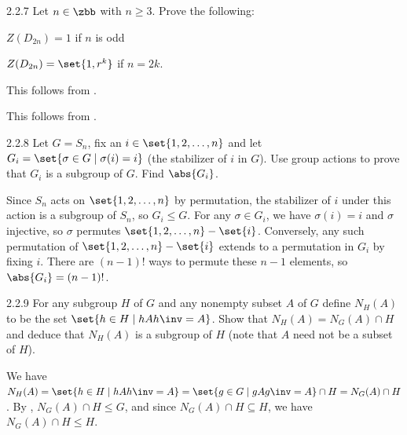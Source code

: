 \begin{exercise}{2.2.7} 
    Let $n \in \zbb$ with $n \geq 3$.
    Prove the following:
    \begin{subexercises}
        \item $Z(D_{2n}) = 1$ if $n$ is odd
        \item $Z(D_{2n}) = \set{1, r^k}$ if $n = 2k$.
    \end{subexercises}
\end{exercise}

\begin{solenum}
    \item This follows from .
    \item This follows from .
\end{solenum}

\begin{exercise}{2.2.8}
    Let $G = S_n$, fix an $i \in \set{1, 2, \dots, n}$ and let $G_i=\set{\sigma\in G\mid\sigma(i)=i}$ (the stabilizer of $i$ in $G$).
	Use group actions to prove that $G_i$ is a subgroup of $G$.
	Find $\abs{G_i}$.
\end{exercise}

\begin{sol}
    Since $S_n$ acts on $\set{1, 2, \ldots, n}$ by permutation, the stabilizer of $i$ under this action is a subgroup of $S_n$, so $G_i \leq G$.
    For any $\sigma \in G_i$, we have $\sigma(i) = i$ and $\sigma$ injective, so $\sigma$ permutes $\set{1, 2, \ldots, n} - \set{i}$.
    Conversely, any such permutation of $\set{1, 2, \ldots, n} - \set{i}$ extends to a permutation in $G_i$ by fixing $i$.
    There are $(n - 1)!$ ways to permute these $n - 1$ elements, so $\abs{G_i} = (n - 1)!$.
\end{sol}

\begin{exercise}{2.2.9}
    For any subgroup $H$ of $G$ and any nonempty subset $A$ of $G$ define $N_H(A)$ to be the set $\set{h \in H \mid hAh\inv = A}$.
	Show that $N_H(A) = N_G(A) \cap H$ and deduce that $N_H(A)$ is a subgroup of $H$ (note that $A$ need not be a subset of $H$).
\end{exercise}

\begin{sol}
    We have $N_H(A) = \set{h \in H \mid hAh\inv = A} = \set{g \in G \mid gAg\inv = A} \cap H = N_G(A) \cap H$.
    By , $N_G(A) \cap H \leq G$, and since $N_G(A) \cap H \subseteq H$, we have $N_G(A) \cap H \leq H$.
\end{sol}

